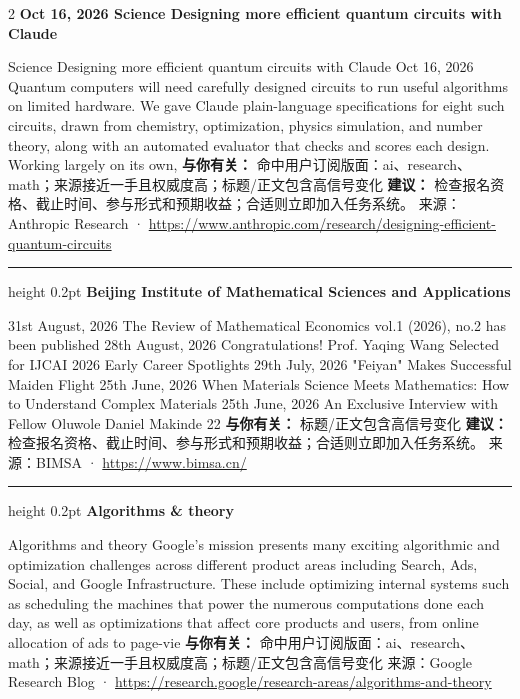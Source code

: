 \documentclass[10.5pt]{ctexart}
\begin{document}
\begin{multicols}{2}
{\large\bfseries Oct 16, 2026 Science Designing more efficient quantum circuits with Claude}\par
Science Designing more efficient quantum circuits with Claude Oct 16, 2026 Quantum computers will need carefully designed circuits to run useful algorithms on limited hardware. We gave Claude plain-language specifications for eight such circuits, drawn from chemistry, optimization, physics simulation, and number theory, along with an automated evaluator that checks and scores each design. Working largely on its own, 
\textbf{与你有关：} 命中用户订阅版面：ai、research、math；来源接近一手且权威度高；标题/正文包含高信号变化
\textbf{建议：} 检查报名资格、截止时间、参与形式和预期收益；合适则立即加入任务系统。
{\footnotesize\color{ormuted} 来源：Anthropic Research · \url{https://www.anthropic.com/research/designing-efficient-quantum-circuits}}
\vspace{2mm}
\hrule height 0.2pt
\vspace{2mm}
{\large\bfseries Beijing Institute of Mathematical Sciences and Applications}\par
31st August, 2026 The Review of Mathematical Economics vol.1 (2026), no.2 has been published 28th August, 2026 Congratulations! Prof. Yaqing Wang Selected for IJCAI 2026 Early Career Spotlights 29th July, 2026 "Feiyan" Makes Successful Maiden Flight 25th June, 2026 When Materials Science Meets Mathematics: How to Understand Complex Materials 25th June, 2026 An Exclusive Interview with Fellow Oluwole Daniel Makinde 22
\textbf{与你有关：} 标题/正文包含高信号变化
\textbf{建议：} 检查报名资格、截止时间、参与形式和预期收益；合适则立即加入任务系统。
{\footnotesize\color{ormuted} 来源：BIMSA · \url{https://www.bimsa.cn/}}
\vspace{2mm}
\hrule height 0.2pt
\vspace{2mm}
{\large\bfseries Algorithms \& theory}\par
Algorithms and theory Google’s mission presents many exciting algorithmic and optimization challenges across different product areas including Search, Ads, Social, and Google Infrastructure. These include optimizing internal systems such as scheduling the machines that power the numerous computations done each day, as well as optimizations that affect core products and users, from online allocation of ads to page-vie
\textbf{与你有关：} 命中用户订阅版面：ai、research、math；来源接近一手且权威度高；标题/正文包含高信号变化
{\footnotesize\color{ormuted} 来源：Google Research Blog · \url{https://research.google/research-areas/algorithms-and-theory}}

\end{multicols}
\end{document}
